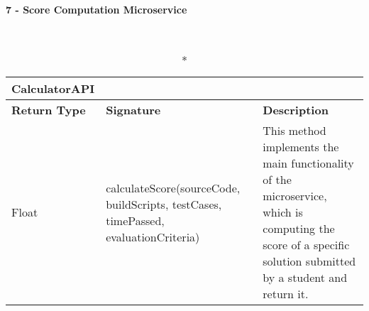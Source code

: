 \vspace{1cm}

\begin{large}{\textbf{7 - Score Computation Microservice}}\end{large}\\

\begin{longtable}{|p{2.5cm} p{6.5cm} p{4.5cm}|}
	\caption*{CalculatorAPI}\\ 
	
	\hline
	\textbf{Return Type} & \textbf{Signature} & \textbf{Description}\\
	\hline \endhead
	
	Float & calculateScore(sourceCode, buildScripts, testCases, timePassed, evaluationCriteria) & This method implements the main functionality of the microservice, which is computing the score of a specific solution submitted by a student and return it.\\
	
	\hline
	
\end{longtable}
